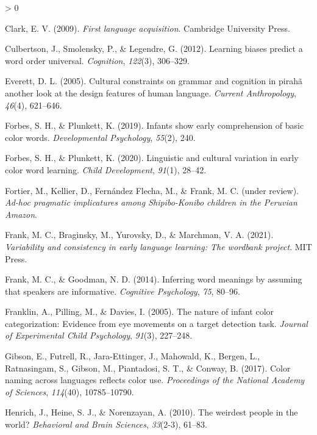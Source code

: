 \documentclass[
  english,
  ,apa7,floatsintext]{apa6}
\newlength{\cslhangindent}
\newenvironment{CSLReferences}[2] %
 {%
  \setlength{\parindent}{0pt}
  \ifodd #1 \everypar{\setlength{\hangindent}{\cslhangindent}}\ignorespaces\fi
  \ifnum #2 > 0
  \setlength{\parskip}{#2\baselineskip}
  \fi
 }%
 {}
\begin{document}
\begin{CSLReferences}{1}{0}
\leavevmode\hypertarget{ref-clark2009}{}%
Clark, E. V. (2009). \emph{First language acquisition}. Cambridge University Press.

\leavevmode\hypertarget{ref-culbertson2012}{}%
Culbertson, J., Smolensky, P., \& Legendre, G. (2012). Learning biases predict a word order universal. \emph{Cognition}, \emph{122}(3), 306--329.

\leavevmode\hypertarget{ref-everett2005}{}%
Everett, D. L. (2005). Cultural constraints on grammar and cognition in pirah{ã} another look at the design features of human language. \emph{Current Anthropology}, \emph{46}(4), 621--646.

\leavevmode\hypertarget{ref-forbes2019}{}%
Forbes, S. H., \& Plunkett, K. (2019). Infants show early comprehension of basic color words. \emph{Developmental Psychology}, \emph{55}(2), 240.

\leavevmode\hypertarget{ref-forbes2020}{}%
Forbes, S. H., \& Plunkett, K. (2020). Linguistic and cultural variation in early color word learning. \emph{Child Development}, \emph{91}(1), 28--42.

\leavevmode\hypertarget{ref-fortierunderreview}{}%
Fortier, M., Kellier, D., Fernández Flecha, M., \& Frank, M. C. (under review). \emph{Ad-hoc pragmatic implicatures among {S}hipibo-{K}onibo children in the {P}eruvian {A}mazon}.

\leavevmode\hypertarget{ref-frank2020}{}%
Frank, M. C., Braginsky, M., Yurovsky, D., \& Marchman, V. A. (2021). \emph{Variability and consistency in early language learning: The wordbank project}. MIT Press.

\leavevmode\hypertarget{ref-frank2014}{}%
Frank, M. C., \& Goodman, N. D. (2014). Inferring word meanings by assuming that speakers are informative. \emph{Cognitive Psychology}, \emph{75}, 80--96.

\leavevmode\hypertarget{ref-franklin2005}{}%
Franklin, A., Pilling, M., \& Davies, I. (2005). The nature of infant color categorization: Evidence from eye movements on a target detection task. \emph{Journal of Experimental Child Psychology}, \emph{91}(3), 227--248.

\leavevmode\hypertarget{ref-gibson2017}{}%
Gibson, E., Futrell, R., Jara-Ettinger, J., Mahowald, K., Bergen, L., Ratnasingam, S., Gibson, M., Piantadosi, S. T., \& Conway, B. (2017). Color naming across languages reflects color use. \emph{Proceedings of the National Academy of Sciences}, \emph{114}(40), 10785--10790.

\leavevmode\hypertarget{ref-henrich2010}{}%
Henrich, J., Heine, S. J., \& Norenzayan, A. (2010). The weirdest people in the world? \emph{Behavioral and Brain Sciences}, \emph{33}(2-3), 61--83.


\end{CSLReferences}
\end{document}
